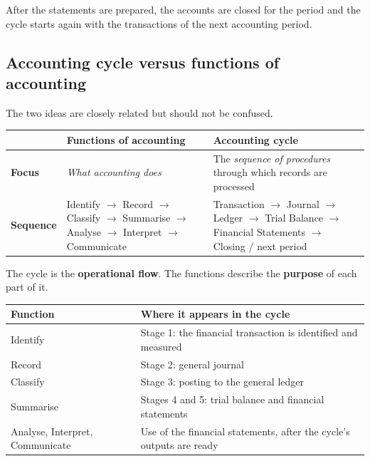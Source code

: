\documentclass[11pt,a4paper]{article}
\begin{document}
After the statements are prepared, the accounts are closed for the period and the cycle starts
again with the transactions of the next accounting period.

\subsection{Accounting cycle versus functions of accounting}

The two ideas are closely related but should not be confused.

\begin{center}
\small
\begin{tabularx}{\textwidth}{@{}l Y Y@{}}
\toprule
{} & \textbf{Functions of accounting} & \textbf{Accounting cycle}\\
\midrule
\textbf{Focus} & \emph{What accounting does} & The \emph{sequence of procedures} through which records are processed\\
\textbf{Sequence} & Identify $\rightarrow$ Record $\rightarrow$ Classify $\rightarrow$ Summarise $\rightarrow$ Analyse $\rightarrow$ Interpret $\rightarrow$ Communicate & Transaction $\rightarrow$ Journal $\rightarrow$ Ledger $\rightarrow$ Trial Balance $\rightarrow$ Financial Statements $\rightarrow$ Closing / next period\\
\bottomrule
\end{tabularx}
\end{center}

The cycle is the \textbf{operational flow}. The functions describe the \textbf{purpose} of each part of it.

\begin{center}
\small
\begin{tabularx}{\textwidth}{@{}Y Y@{}}
\toprule
{}\textbf{Function} & \textbf{Where it appears in the cycle}\\
\midrule
Identify & Stage 1: the financial transaction is identified and measured\\
Record & Stage 2: general journal\\
Classify & Stage 3: posting to the general ledger\\
Summarise & Stages 4 and 5: trial balance and financial statements\\
Analyse, Interpret, Communicate & Use of the financial statements, after the cycle's outputs are ready\\
\bottomrule
\end{tabularx}
\end{center}
\end{document}
